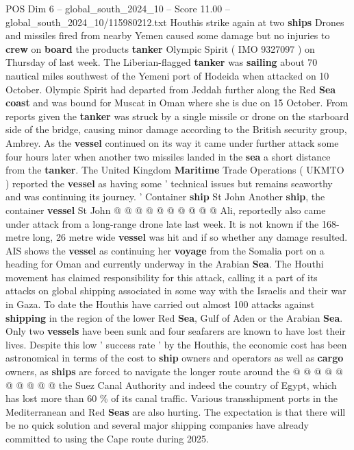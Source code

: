 \begin{textsample}{POS Dim 6 – global\_south\_2024\_10 – Score 11.00 – global\_south\_2024\_10/115980212.txt}  \label{ex:f6_pos_397}
Houthis strike again at two \textbf{ships} Drones and missiles fired from nearby Yemen caused some damage but no injuries to \textbf{crew} on \textbf{board} the products \textbf{tanker} Olympic Spirit ( IMO 9327097 ) on Thursday of last week.
The Liberian-flagged \textbf{tanker} was \textbf{sailing} about 70 nautical miles southwest of the Yemeni port of Hodeida when attacked on 10 October.
Olympic Spirit had departed from Jeddah further along the Red \textbf{Sea} \textbf{coast} and was bound for Muscat in Oman where she is due on 15 October.
From reports given the \textbf{tanker} was struck by a single missile or drone on the starboard side of the bridge, causing minor damage according to the British security group, Ambrey.
As the \textbf{vessel} continued on its way it came under further attack some four hours later when another two missiles landed in the \textbf{sea} a short distance from the \textbf{tanker}.
The United Kingdom \textbf{Maritime} Trade Operations ( UKMTO ) reported the \textbf{vessel} as having some ' technical issues but remains seaworthy and was continuing its journey. ' Container \textbf{ship} St John Another \textbf{ship}, the container \textbf{vessel} St John @ @ @ @ @ @ @ @ @ @ Ali, reportedly also came under attack from a long-range drone late last week.
It is not known if the 168-metre long, 26 metre wide \textbf{vessel} was hit and if so whether any damage resulted.
AIS shows the \textbf{vessel} as continuing her \textbf{voyage} from the Somalia port on a heading for Oman and currently underway in the Arabian \textbf{Sea}.
The Houthi movement has claimed responsibility for this attack, calling it a part of its attacks on global shipping associated in some way with the Israelis and their war in Gaza.
To date the Houthis have carried out almost 100 attacks against \textbf{shipping} in the region of the lower Red \textbf{Sea}, Gulf of Aden or the Arabian \textbf{Sea}.
Only two \textbf{vessels} have been sunk and four seafarers are known to have lost their lives.
Despite this low ' success rate ' by the Houthis, the economic cost has been astronomical in terms of the cost to \textbf{ship} owners and operators as well as \textbf{cargo} owners, as \textbf{ships} are forced to navigate the longer route around the @ @ @ @ @ @ @ @ @ @ the Suez Canal Authority and indeed the country of Egypt, which has lost more than 60 \% of its canal traffic.
Various transshipment ports in the Mediterranean and Red \textbf{Seas} are also hurting.
The expectation is that there will be no quick solution and several major shipping companies have already committed to using the Cape route during 2025.

\end{textsample}
